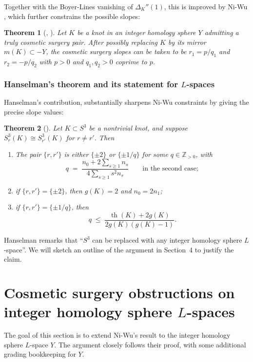 \documentclass[12pt]{amsart}
\newtheorem{theorem}{Theorem}[section]
\theoremstyle{definition}
\theoremstyle{definition}
\newcommand{\Z}{{\mathbb{Z}}}
\DeclareMathOperator{\Th}{th}
\begin{document}
Together with the Boyer-Lines vanishing of $\Delta_K''(1)$, this is
improved by Ni-Wu , which further constrains the possible slopes:
 
\begin{theorem}[{\cite[Theorem~1.2]{NiWu}, \cite{Wu}}]\label{thm:NiWu}
Let $K$ be a knot in an integer homology sphere $Y$ admitting a truly
cosmetic surgery pair. After possibly replacing $K$ by its mirror
$m(K) \subset -Y$, the cosmetic surgery slopes can be taken to be
$r_1 = p/q_1$ and $r_2 = -p/q_2$ with $p > 0$ and $q_1, q_2 > 0$
coprime to $p$.
\end{theorem}
 
 
\subsubsection*{Hanselman's theorem and its statement for $L$-spaces}
 
Hanselman's contribution, substantially sharpens Ni-Wu constraints by giving the precise slope values:
 
\begin{theorem}[{\cite[Theorem~2]{Han}}]\label{thm:Hanselman}
Let $K \subset S^3$ be a nontrivial knot, and suppose
$S^3_r(K) \cong S^3_{r'}(K)$ for $r \neq r'$. Then
\begin{enumerate}
\item[\rm (i)] The pair $\{r, r'\}$ is either $\{\pm 2\}$ or $\{\pm 1/q\}$
for some $q \in \Z_{> 0}$, with
\[
q \;=\; \frac{n_0 + 2 \sum_{s \geq 1} n_s}{4 \sum_{s \geq 1} s^2 n_s}
\qquad \text{in the second case};
\]
\item[\rm (ii)] if $\{r, r'\} = \{\pm 2\}$, then $g(K) = 2$ and
$n_0 = 2 n_1$;
\item[\rm (iii)] if $\{r, r'\} = \{\pm 1/q\}$, then
\[
q \;\leq\; \frac{\Th(K) + 2 g(K)}{2 g(K) (g(K) - 1)}.
\]
\end{enumerate}
\end{theorem}

Hanselman \cite{Han} remarks that ``$S^3$ can be replaced with any integer homology sphere $L$-space''. We will sketch an outline of the argument in Section~4 to justify the claim.



\section{Cosmetic surgery obstructions on integer homology sphere $L$-spaces }


The goal of this section is to extend Ni-Wu's result to the integer homology sphere $L$-space $Y$. The argument closely follows their proof, with some additional grading bookkeeping for $Y$.
\end{document}
